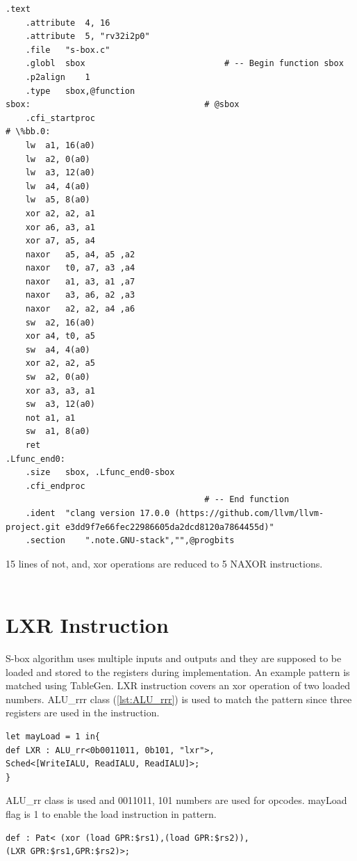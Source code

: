 \begin{lstlisting}[caption= Assembly output with NAXOR instruction]
    .text
	.attribute	4, 16
	.attribute	5, "rv32i2p0"
	.file	"s-box.c"
	.globl	sbox                            # -- Begin function sbox
	.p2align	1
	.type	sbox,@function
sbox:                                   # @sbox
	.cfi_startproc
# \%bb.0:
	lw	a1, 16(a0)
	lw	a2, 0(a0)
	lw	a3, 12(a0)
	lw	a4, 4(a0)
	lw	a5, 8(a0)
	xor	a2, a2, a1
	xor	a6, a3, a1
	xor	a7, a5, a4
	naxor	a5, a4, a5 ,a2
	naxor	t0, a7, a3 ,a4
	naxor	a1, a3, a1 ,a7
	naxor	a3, a6, a2 ,a3
	naxor	a2, a2, a4 ,a6
	sw	a2, 16(a0)
	xor	a4, t0, a5
	sw	a4, 4(a0)
	xor	a2, a2, a5
	sw	a2, 0(a0)
	xor	a3, a3, a1
	sw	a3, 12(a0)
	not	a1, a1
	sw	a1, 8(a0)
	ret
.Lfunc_end0:
	.size	sbox, .Lfunc_end0-sbox
	.cfi_endproc
                                        # -- End function
	.ident	"clang version 17.0.0 (https://github.com/llvm/llvm-project.git e3dd9f7e66fec22986605da2dcd8120a7864455d)"
	.section	".note.GNU-stack","",@progbits

\end{lstlisting}

15 lines of not, and, xor operations are reduced to 5 NAXOR instructions.
\\\\






\section{LXR Instruction}

S-box algorithm uses multiple inputs and outputs and they are supposed to be loaded and stored to the registers during implementation. An example pattern is matched using TableGen. LXR instruction covers an xor operation of two loaded numbers. ALU\_rrr class (\ref{lst:ALU_rrr}) is used to match the pattern since three registers are used in the instruction.

\begin{lstlisting}
let mayLoad = 1 in{
def LXR : ALU_rr<0b0011011, 0b101, "lxr">,
Sched<[WriteIALU, ReadIALU, ReadIALU]>;
}
\end{lstlisting}

ALU\_rr class is used and 0011011, 101 numbers are used for opcodes. mayLoad flag is 1 to enable the load instruction in pattern.
\\
\begin{lstlisting}
def : Pat< (xor (load GPR:$rs1),(load GPR:$rs2)),
(LXR GPR:$rs1,GPR:$rs2)>;
\end{lstlisting}

